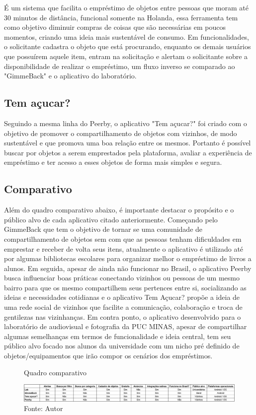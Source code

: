     É um sistema que facilita o empréstimo de objetos entre pessoas que moram até 30 minutos de distância, funcional somente na Holanda, essa ferramenta tem como objetivo diminuir compras de coisas que são necessárias em poucos momentos, criando uma ideia mais sustentável de consumo. Em funcionalidades, o solicitante cadastra o objeto que está procurando, enquanto os demais usuários que possuírem aquele item, entram na solicitação e alertam o solicitante sobre a disponibilidade de realizar o empréstimo, um fluxo inverso se comparado ao "GimmeBack" e o aplicativo do laboratório.
    
    \subsection{Tem açucar?}
    
    Seguindo a mesma linha do Peerby, o aplicativo "Tem açucar?"  foi criado com o objetivo de promover o compartilhamento de objetos com vizinhos, de modo sustentável e que promova uma boa relação entre os mesmos. Portanto é possível buscar por objetos a serem emprestados pela plataforma, avaliar a experiência de empréstimo e ter acesso a esses objetos de forma mais simples e segura.
    
    \subsection{Comparativo}
    
    Além do quadro comparativo abaixo, é importante destacar o propósito e o público alvo de cada aplicativo citado anteriormente. Começando pelo GimmeBack que tem o objetivo de tornar se uma comunidade de compartilhamento de objetos sem com que as pessoas tenham dificuldades em emprestar e receber de volta seus itens, atualmente o aplicativo é utilizado até por algumas bibliotecas escolares para organizar melhor o empréstimo de livros a alunos. Em seguida, apesar de ainda não funcionar no Brasil, o aplicativo Peerby busca influenciar boas práticas conectando vizinhos ou pessoas de um mesmo bairro para que os mesmo compartilhem seus pertences entre si, socializando as ideias e necessidades cotidianas e o aplicativo Tem Açucar? propõe a ideia de uma rede social de vizinhos que facilite a comunicação, colaboração e troca de gentilezas nas vizinhanças. Em contra ponto, o aplicativo desenvolvido para o laboratório de audiovisual e fotografia da PUC MINAS, apesar de compartilhar algumas semelhanças em termos de funcionalidade e ideia central, tem seu público alvo focado nos alunos da universidade com um nicho pré definido de objetos/equipamentos que irão compor os cenários dos empréstimos.
    
    \begin{figure}[h]
    \caption{Quadro comparativo}
    \centering %
    \includegraphics[width=16cm]{imagem/quadro-comparativo.png}
    \caption*{Fonte: Autor}
    \label{figura:comparative-board}
    \end{figure}
